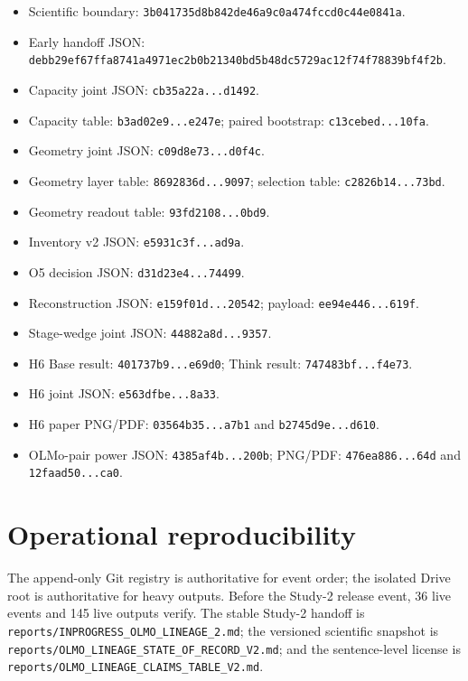 \documentclass[11pt]{article}
\begin{document}
\begin{itemize}
  \item Scientific boundary:
    \texttt{3b041735d8b842de46a9c0a474fccd0c44e0841a}.
  \item Early handoff JSON:
    \texttt{debb29ef67ffa8741a4971ec2b0b21340bd5b48dc5729ac12f74f78839bf4f2b}.
  \item Capacity joint JSON: \texttt{cb35a22a...d1492}.
  \item Capacity table: \texttt{b3ad02e9...e247e}; paired bootstrap:
    \texttt{c13cebed...10fa}.
  \item Geometry joint JSON: \texttt{c09d8e73...d0f4c}.
  \item Geometry layer table: \texttt{8692836d...9097}; selection table:
    \texttt{c2826b14...73bd}.
  \item Geometry readout table: \texttt{93fd2108...0bd9}.
  \item Inventory v2 JSON: \texttt{e5931c3f...ad9a}.
  \item O5 decision JSON: \texttt{d31d23e4...74499}.
  \item Reconstruction JSON: \texttt{e159f01d...20542}; payload:
    \texttt{ee94e446...619f}.
  \item Stage-wedge joint JSON: \texttt{44882a8d...9357}.
  \item H6 Base result: \texttt{401737b9...e69d0}; Think result:
    \texttt{747483bf...f4e73}.
  \item H6 joint JSON: \texttt{e563dfbe...8a33}.
  \item H6 paper PNG/PDF: \texttt{03564b35...a7b1} and
    \texttt{b2745d9e...d610}.
  \item OLMo-pair power JSON: \texttt{4385af4b...200b}; PNG/PDF:
    \texttt{476ea886...64d} and \texttt{12faad50...ca0}.
\end{itemize}

\section{Operational reproducibility}

The append-only Git registry is authoritative for event order; the isolated
Drive root is authoritative for heavy outputs. Before the Study-2 release
event, 36 live events and 145 live outputs verify. The stable Study-2 handoff is
\nolinkurl{reports/INPROGRESS_OLMO_LINEAGE_2.md}; the versioned scientific
snapshot is \nolinkurl{reports/OLMO_LINEAGE_STATE_OF_RECORD_V2.md}; and the
sentence-level license is
\nolinkurl{reports/OLMO_LINEAGE_CLAIMS_TABLE_V2.md}.
\end{document}
